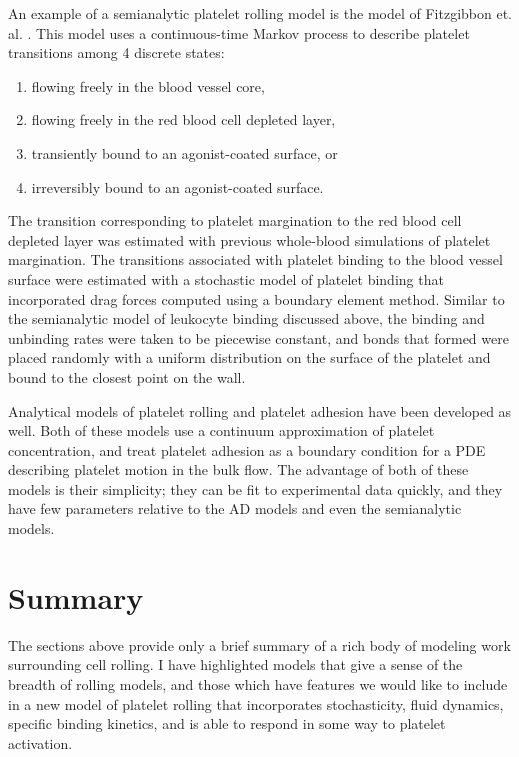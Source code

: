 An example of a semianalytic platelet rolling model is the model of
Fitzgibbon et. al. \cite{Fitzgibbon2014}. This model uses a
continuous-time Markov process to describe platelet transitions among
4 discrete states:
\begin{enumerate}
\item flowing freely in the blood vessel core,
\item flowing freely in the red blood cell depleted layer,
\item transiently bound to an agonist-coated surface, or
\item irreversibly bound to an agonist-coated surface.
\end{enumerate}
The transition corresponding to platelet margination to the red blood
cell depleted layer was estimated with previous whole-blood
simulations of platelet margination. The transitions associated with
platelet binding to the blood vessel surface were estimated with a
stochastic model of platelet binding that incorporated drag forces
computed using a boundary element method. Similar to the semianalytic
model of leukocyte \cite{Tozeren1992} binding discussed above, the
binding and unbinding rates were taken to be piecewise constant, and
bonds that formed were placed randomly with a uniform distribution on
the surface of the platelet and bound to the closest point on the
wall.

Analytical models of platelet rolling \cite{Pujos2018} and platelet
adhesion \cite{Tokarev2011} have been developed as well. Both of these
models use a continuum approximation of platelet concentration, and
treat platelet adhesion as a boundary condition for a PDE describing
platelet motion in the bulk flow. The advantage of both of these
models is their simplicity; they can be fit to experimental data
quickly, and they have few parameters relative to the AD models and
even the semianalytic models.

\section{Summary}
\label{sec:summary-background}

The sections above provide only a brief summary of a rich body of
modeling work surrounding cell rolling. I have highlighted models that
give a sense of the breadth of rolling models, and those which have
features we would like to include in a new model of platelet rolling
that incorporates stochasticity, fluid dynamics, specific binding
kinetics, and is able to respond in some way to platelet activation.


